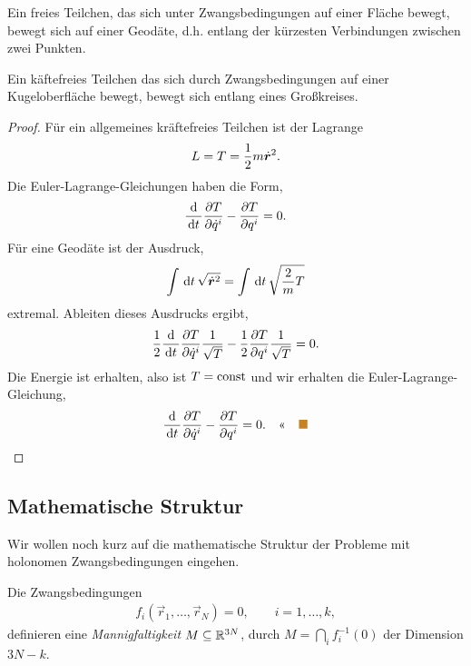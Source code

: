 \begin{bemn}
Ein freies Teilchen, das sich unter Zwangsbedingungen auf einer Fläche bewegt,
bewegt sich auf einer Geodäte, d.h. entlang der kürzesten Verbindungen zwischen
zwei Punkten.\maphere
\end{bemn}
\begin{bsp}
Ein käftefreies Teilchen das sich durch Zwangsbedingungen auf einer
Kugeloberfläche bewegt, bewegt sich entlang eines Großkreises.
\begin{proof}
Für ein allgemeines kräftefreies Teilchen ist der Lagrange
\begin{align*}
L = T = \frac{1}{2}m\dot{\bm{r}}^2.
\end{align*}
Die Euler-Lagrange-Gleichungen haben die Form,
\begin{align*}
\frac{\mathrm{d}}{\,\mathrm{d} t\,}\frac{\partial T}{\partial \dot{q}^i} - \frac{\partial
T}{\partial q^i}  = 0.
\end{align*}
Für eine Geodäte ist der Ausdruck,
\begin{align*}
\int\,\mathrm{d} t\, \sqrt{\dot{\bm{r}}^2} = \int\,\mathrm{d} t\, \sqrt{\frac{2}{m}T}
\end{align*}
extremal. Ableiten dieses Ausdrucks ergibt,
\begin{align*}
\frac{1}{2}\frac{\mathrm{d}}{\,\mathrm{d} t\,}\frac{\partial T}{\partial
\dot{q}^i}\frac{1}{\sqrt{T}} - \frac{1}{2}\frac{\partial T}{\partial
q^i}\frac{1}{\sqrt{T}} = 0.
\end{align*}
Die Energie ist erhalten, also ist $T=\mathrm{const}$ und wir erhalten die
Euler-Lagrange-Gleichung,
\begin{align*}
\frac{\diffd}{\dt}\frac{\partial T}{\partial \dot{q}^i} - \frac{\partial
T}{\partial q^i}  = 0.\qedhere\bsphere
\end{align*}
\end{proof}
\end{bsp}

\subsection{Mathematische Struktur}

Wir wollen noch kurz auf die mathematische Struktur der Probleme mit holonomen
Zwangsbedingungen eingehen.

Die Zwangsbedingungen
\begin{align*}
f_i(\vec{r}_1,\ldots,\vec{r}_N) = 0,\qquad i = 1,\ldots,k,
\end{align*}
definieren eine \emph{Mannigfaltigkeit} $M\subseteq\mathbb{R}^{3N}$, durch $M =
\bigcap_i f_i^{-1}(0)$ der Dimension $3N-k$.


